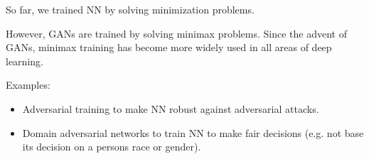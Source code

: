 \documentclass{report}
\begin{document}
\begin{concept}
    So far, we trained NN by solving minimization problems.

    However, GANs are trained by solving minimax problems. Since the advent of GANs, minimax training has become more widely used in all areas of deep learning.

    Examples:

    \begin{itemize}
        \item Adversarial training to make NN robust against adversarial attacks.
        \item Domain adversarial networks to train NN to make fair decisions (e.g. not base its decision on a persons race or gender).
    \end{itemize}
\end{concept}
\end{document}
